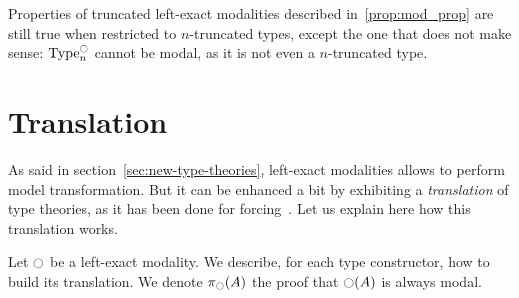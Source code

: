 Properties of truncated left-exact modalities described
in~\ref{prop:mod_prop} are still true when restricted to $n$-truncated
types, except the one that does not make sense: $\operatorname{Type}_n^{\ocircle}$
cannot be modal, as it is not even a $n$-truncated type.


\section{Translation}
\label{sec:translation}

As said in section~\ref{sec:new-type-theories}, left-exact modalities
allows to perform model transformation. But it can be enhanced a bit
by exhibiting a {\em translation} of type theories, as it has been done for
forcing~\cite{jaber2012extending}. Let us explain
here how this translation works.

Let $\ocircle$ be a left-exact modality. We describe, for each type
constructor, how to build its translation. We denote $\pi_{\ocircle}(A)$
the proof that $\ocircle(A)$ is always modal.


